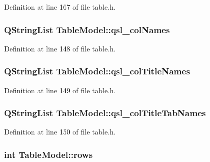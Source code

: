 Definition at line 167 of file table.h.

\hypertarget{classTableModel_af80c02eb0f33a2c10804aae3c35699f8}{
\subsubsection[{qsl\_\-colNames}]{\setlength{\rightskip}{0pt plus 5cm}QStringList {\bf TableModel::qsl\_\-colNames}}}
\label{classTableModel_af80c02eb0f33a2c10804aae3c35699f8}


Definition at line 148 of file table.h.

\hypertarget{classTableModel_a09bb7e46ef71f2a97ea01d73f5e2cb02}{
\subsubsection[{qsl\_\-colTitleNames}]{\setlength{\rightskip}{0pt plus 5cm}QStringList {\bf TableModel::qsl\_\-colTitleNames}}}
\label{classTableModel_a09bb7e46ef71f2a97ea01d73f5e2cb02}


Definition at line 149 of file table.h.

\hypertarget{classTableModel_a96ee46443dfe2b3eae27af6919781450}{
\subsubsection[{qsl\_\-colTitleTabNames}]{\setlength{\rightskip}{0pt plus 5cm}QStringList {\bf TableModel::qsl\_\-colTitleTabNames}}}
\label{classTableModel_a96ee46443dfe2b3eae27af6919781450}


Definition at line 150 of file table.h.

\hypertarget{classTableModel_ab55a02518eefc1d6fc1bcf0ea62be849}{
\subsubsection[{rows}]{\setlength{\rightskip}{0pt plus 5cm}int {\bf TableModel::rows}}}
\label{classTableModel_ab55a02518eefc1d6fc1bcf0ea62be849}


